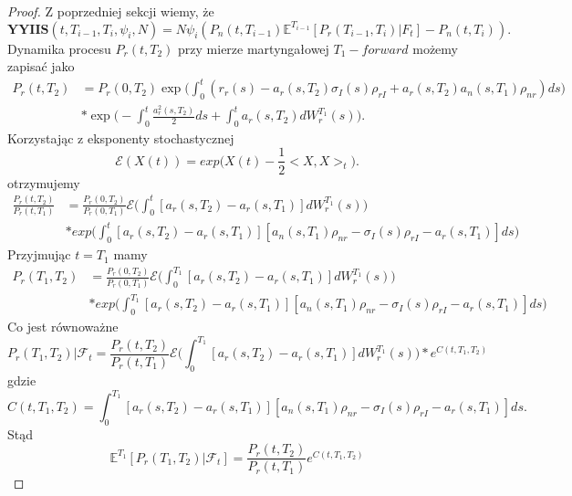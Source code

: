 \documentclass{mini}
\theoremstyle{mythstyle}
\begin{document}
	\begin{proof}
	Z poprzedniej sekcji wiemy, że
	\begin{equation*}
	\textbf{YYIIS}(t,T_{i-1},T_i,\psi_i,N) = N\psi_i (P_n(t,T_{i-1})\mathbb{E}^{T_{i-1}}[P_r(T_{i-1},T_i)|F_t]-P_n(t,T_i)).
	\end{equation*}
	Dynamika procesu $P_r(t,T_2)$ przy mierze martyngałowej $T_1-forward$ możemy zapisać jako
	\begin{align*}
	P_r(t, T_2) &= P_r(0, T_2) \exp \bigg( \int_{0}^{t} (r_r(s) - a_r(s, T_2) \sigma_I(s)\rho_{rI} + a_r(s, T_2)a_n(s, T_1)\rho_{nr}) ds \bigg) \\
	&* \exp \bigg(-\int_{0}^{t} \frac{a^2_r(s, T_2)}{2}ds + \int_{0}^{t} a_r(s, T_2)dW_r^{T_1}(s)\bigg).
	\end{align*}
	Korzystając z eksponenty stochastycznej
	\begin{equation*}
		\mathcal{E} (X(t)) = exp \bigg(X(t) - \frac{1}{2}<X,X>_t\bigg).
	\end{equation*}
otrzymujemy
	\begin{align*}
	\frac{P_r(t,T_2)}{P_r(t,T_1)} &= \frac{P_r(0,T_2)}{P_r(0,T_1)} \mathcal{E}  \bigg( \int_{0}^{t} [a_r(s,T_2) - a_r(s,T_1)]dW_r^{T_1}(s)\bigg)\\
	&*exp\bigg(\int_{0}^{t} [a_r(s,T_2) - a_r(s,T_1)][a_n(s,T_1)\rho_{nr} - \sigma_I(s)\rho_{rI} - a_r(s,T_1)]ds \bigg)
	\end{align*}
	Przyjmując $t = T_1$ mamy
	\begin{align*}
	P_r(T_1,T_2) &= \frac{P_r(0,T_2)}{P_r(0,T_1)} \mathcal{E} \bigg( \int_{0}^{T_1} [a_r(s,T_2) - a_r(s,T_1)]dW_r^{T_1}(s)\bigg)\\
	&*exp\bigg(\int_{0}^{T_1} [a_r(s,T_2) - a_r(s,T_1)][a_n(s,T_1)\rho_{nr} - \sigma_I(s)\rho_{rI} - a_r(s,T_1)]ds \bigg)
	\end{align*}
	Co jest równoważne
	\begin{equation*}
	P_r(T_1,T_2) | \mathcal{F}_t = \frac{P_r(t,T_2)}{P_r(t,T_1)} \mathcal{E}  \bigg( \int_{0}^{T_1} [a_r(s,T_2) - a_r(s,T_1)]dW_r^{T_1}(s)\bigg) * e^{C(t,T_1,T_2)}
	\end{equation*}
	gdzie
	\begin{equation*}
	C(t,T_1,T_2) = \int_{0}^{T_1} [a_r(s,T_2) - a_r(s,T_1)][a_n(s,T_1)\rho_{nr} - \sigma_I(s)\rho_{rI} - a_r(s,T_1)]ds.
	\end{equation*}
	Stąd
	\begin{equation*}
	\mathbb{E}^{T_1}[P_r(T_1,T_2) | \mathcal{F}_t] = \frac{P_r(t,T_2)}{P_r(t,T_1)} e^{C(t,T_1,T_2)}
	\end{equation*}

\end{proof}
\end{document}
